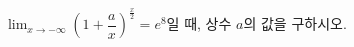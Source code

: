 $\displaystyle\lim_{x\to-\infty}\left(1+\dfrac{a}{x}\right)^{\frac{x}{2}}=e^8$일 때, 상수 $a$의 값을 구하시오.

